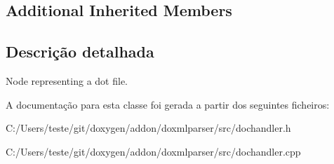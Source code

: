 \subsection*{Additional Inherited Members}


\subsection{Descrição detalhada}
Node representing a dot file. 



A documentação para esta classe foi gerada a partir dos seguintes ficheiros\-:\begin{DoxyCompactItemize}
\item 
C\-:/\-Users/teste/git/doxygen/addon/doxmlparser/src/dochandler.\-h\item 
C\-:/\-Users/teste/git/doxygen/addon/doxmlparser/src/dochandler.\-cpp\end{DoxyCompactItemize}
